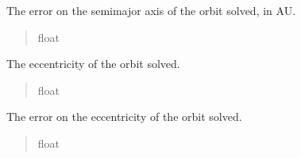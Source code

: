 \documentclass[letterpaper,11pt,english]{sphinxmanual}
\begin{document}
\begin{savenotes}
\begin{fulllineitems}
\begin{savenotes}\begin{fulllineitems}
\label{\detokenize{code/opihiexarata.orbit.solution:opihiexarata.orbit.solution.OrbitalSolution.semimajor_axis_error}}
\pysigstartsignatures
{}
\pysigstopsignatures
\sphinxAtStartPar
The error on the semi\sphinxhyphen{}major axis of the orbit solved, in AU.
\begin{quote}\begin{description}
\sphinxAtStartPar
float

\end{description}\end{quote}

\end{fulllineitems}\end{savenotes}


\begin{savenotes}\begin{fulllineitems}
\label{\detokenize{code/opihiexarata.orbit.solution:opihiexarata.orbit.solution.OrbitalSolution.eccentricity}}
\pysigstartsignatures
{}
\pysigstopsignatures
\sphinxAtStartPar
The eccentricity of the orbit solved.
\begin{quote}\begin{description}
\sphinxAtStartPar
float

\end{description}\end{quote}

\end{fulllineitems}\end{savenotes}


\begin{savenotes}\begin{fulllineitems}
\label{\detokenize{code/opihiexarata.orbit.solution:opihiexarata.orbit.solution.OrbitalSolution.eccentricity_error}}
\pysigstartsignatures
{}
\pysigstopsignatures
\sphinxAtStartPar
The error on the eccentricity of the orbit solved.
\begin{quote}\begin{description}
\sphinxAtStartPar
float


\end{description}
\end{quote}
\end{fulllineitems}
\end{savenotes}
\end{fulllineitems}
\end{savenotes}
\end{document}
